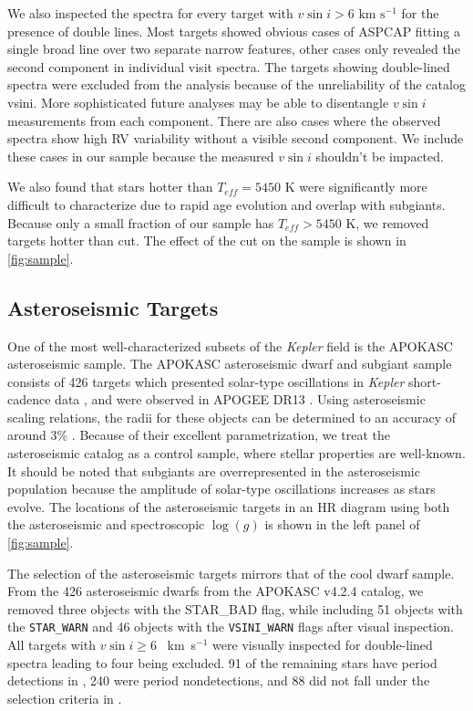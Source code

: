 \documentclass[manuscript]{aastex6}
\newcommand{\vsini}{\ensuremath{v \sin i}}
\newcommand{\Kepler}{\mbox{\textit{Kepler}}}
\newcommand{\Teff}{\ensuremath{T_{eff}}}
\newcommand{\logg}{\ensuremath{\log(g)}}
\newcommand{\kms}{\textrm{~km~s}\ensuremath{^{-1}}}
\newcommand{\STARWARN}{\texttt{STAR\_WARN}}
\newcommand{\VSINIWARN}{\texttt{VSINI\_WARN}}
\begin{document}
We also inspected the spectra for every target with \(\vsini > 6 \kms\)
for the presence of double lines. Most targets showed obvious cases of ASPCAP 
fitting a single broad line over two separate narrow features, other cases 
only revealed the second component in individual visit spectra. The targets 
showing double-lined spectra were excluded from the analysis because of
the unreliability of the catalog vsini. More sophisticated future
analyses \citet{ElBadry18} may be able to disentangle \vsini{}
measurements from each component. There are
also cases where the observed spectra show high RV variability
without a visible second component. We include these cases in our sample
because the measured \vsini{} shouldn't be impacted.


We also found that stars hotter than
\(\Teff = 5450\) K were significantly more difficult to characterize due to
rapid age evolution and overlap with subgiants. Because only a small 
fraction of our sample has \(\Teff > 5450\) K, we removed targets hotter
than cut. The effect of the cut on the sample is shown in \cref{fig:sample}.

\subsection{Asteroseismic Targets}

One of the most well-characterized subsets of the \Kepler{} field is the
APOKASC asteroseismic sample. The APOKASC asteroseismic dwarf and subgiant 
sample consists of 426 targets which presented solar-type oscillations in 
\Kepler{} short-cadence data \citep{Chaplin11}, and were observed in APOGEE DR13
\citep{Majewski17}. Using asteroseismic scaling relations, the radii
for these objects can be determined to an accuracy of around 3\%
\citep{Serenelli17}. Because of their excellent parametrization, we treat the
asteroseismic catalog as a control sample, where stellar properties are
well-known. It should be noted that subgiants are overrepresented in
the asteroseismic population because the amplitude of solar-type oscillations 
increases as stars evolve. The locations of the asteroseismic targets in an HR
diagram using both the asteroseismic and spectroscopic \logg{} is shown in 
the left panel of \cref{fig:sample}.

The selection of the asteroseismic targets mirrors that of the cool dwarf
sample. From the 426 asteroseismic dwarfs from the APOKASC v4.2.4 catalog, we 
removed three objects with the STAR\_BAD flag, while including 51 objects with 
the \STARWARN{} and 46 objects with the \VSINIWARN{} flags after visual 
inspection. All targets with \(\vsini \ge 6\) \kms{} were visually
inspected for double-lined spectra leading to four being excluded. 91 of 
the remaining stars have period detections in \citet{McQuillan14}, 240 were 
period nondetections, and 88 did not fall under the selection criteria in 
\citet{McQuillan14}. 
\end{document}
